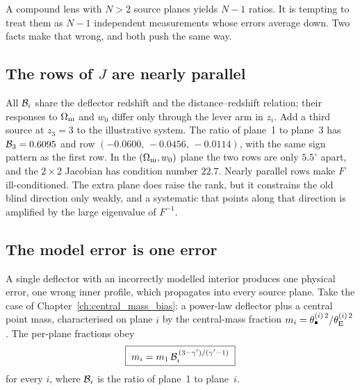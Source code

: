 A compound lens with $N>2$ source planes yields $N-1$ ratios. It is
tempting to treat them as $N-1$ independent measurements whose errors
average down. Two facts make that wrong, and both push the same way.

\subsection{The rows of $J$ are nearly parallel}

All $\mathcal{B}_i$ share the deflector redshift and the distance--redshift
relation; their responses to $\Omega_{\mathrm{m}}$ and $w_0$ differ only through the
lever arm in $z_i$. Add a third source at $z_3=3$ to the illustrative
system. The ratio of plane~1 to plane~3 has $\mathcal{B}_3=0.6095$ and row
$(-0.0600,\,-0.0456,\,-0.0114)$, with the same sign pattern as the first
row. In the $(\Omega_{\mathrm{m}},w_0)$ plane the two rows are only $5.5^\circ$
apart, and the $2\times2$ Jacobian has condition number $22.7$. Nearly
parallel rows make $F$ ill-conditioned. The extra plane does raise the
rank, but it constrains the old blind direction only weakly, and a
systematic that points along that direction is amplified by the large
eigenvalue of $F^{-1}$.

\subsection{The model error is one error}

A single deflector with an incorrectly modelled interior produces one
physical error, one wrong inner profile, which propagates into
every source plane. Take the case of
Chapter~\ref{ch:central_mass_bias}: a power-law deflector plus a central
point mass, characterised on plane $i$ by the central-mass fraction
$m_i=\theta_{\bullet}^{(i)\,2}/\theta_{\mathrm{E}}^{(i)\,2}$. The per-plane fractions
obey
\begin{equation}
  \boxed{\;m_i=m_1\,\mathcal{B}_i^{\,(3-\gamma')/(\gamma'-1)}\;}
  \label{eq:cs_mscaling}
\end{equation}
for every $i$, where $\mathcal{B}_i$ is the ratio of plane~1 to plane~$i$.

